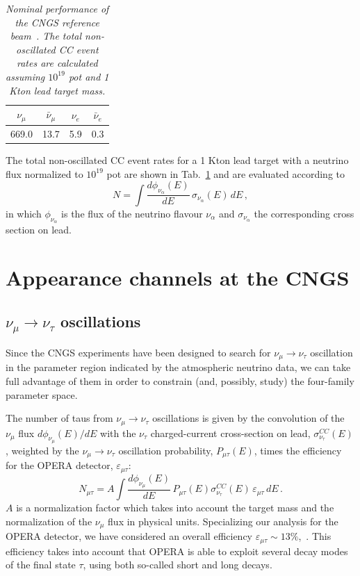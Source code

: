 \documentclass[12pt]{elsart}
\begin{document}
\begin{table}[t] \centering
    \begin{tabular}{|c|c|c|c|}
	\hline
	\hline
	$\nu_{\mu}$ &  $\bar \nu_{\mu}$ & $\nu_e$ &  $\bar \nu_e$\\
	\hline
	669.0 &13.7 & 5.9& 0.3\\
	\hline\hline
    \end{tabular}
    \caption{\label{tab:rates}\sl%
      Nominal performance of the CNGS reference beam~\cite{fluxes}.
      The total non-oscillated CC event rates are calculated assuming
      $10^{19}$ pot and 1 Kton lead target mass.}
\end{table}

The total non-oscillated CC event rates for a 1 Kton lead target with
a neutrino flux normalized to $10^{19}$ pot are shown in
Tab.~\ref{tab:rates} and are evaluated according to
%
\begin{equation}
    N = \int \frac{d \phi_{\nu_\alpha}(E)}{dE} \,
    \sigma_{\nu_\alpha}(E) \, dE \,,
\end{equation}
%
in which $\phi_{\nu_\alpha}$ is the flux of the neutrino flavour
$\nu_\alpha$ and $\sigma_{\nu_\alpha}$ the corresponding cross section
on lead.

\section{Appearance channels at the CNGS}
\label{sec:app}

\subsection{$\nu_\mu \to \nu_\tau$ oscillations}
\label{sec:apptau}

Since the CNGS experiments have been designed to search for $\nu_\mu
\to \nu_\tau$ oscillation in the parameter region indicated by the
atmospheric neutrino data, we can take full advantage of them in order
to constrain (and, possibly, study) the four-family parameter space. 

The number of taus from $\nu_\mu \to \nu_\tau$ oscillations is given
by the convolution of the $\nu_\mu$ flux $ d \phi_{\nu_{\mu}}(E) / dE$
with the $\nu_\tau$ charged-current cross-section on lead, 
$\sigma_{\nu_\tau}^{CC}(E)$, weighted by the $\nu_\mu \to \nu_\tau$
oscillation probability, $P_{\mu \tau}(E)$, times the efficiency for
the OPERA detector, $\varepsilon_{\mu \tau}$:
%
\begin{equation}
    \label{eq:signaltau}
    N_{\mu \tau} = A \int \frac{ d\phi_{\nu_{\mu}}(E)}{dE} \,
    P_{\mu \tau}(E) \sigma_{\nu_\tau}^{CC}(E) \,
    \varepsilon_{\mu \tau} \, dE \,.
\end{equation}
%
$A$ is a normalization factor which takes into account the target mass
and the normalization of the $\nu_\mu$ flux in physical units. 
Specializing our analysis for the OPERA detector, we have considered
an overall efficiency $\varepsilon_{\mu \tau} \sim
13\%$,~\cite{Migliozzi:2006fy}. This efficiency takes into account
that OPERA is able to exploit several decay modes of the final state
$\tau$, using both so-called short and long decays.  
\end{document}

